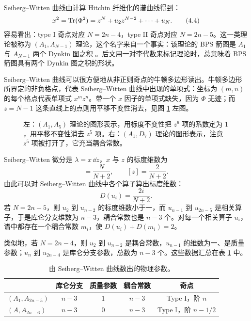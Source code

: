 Seiberg--Witten 曲线由计算 Hitchin 纤维化的谱曲线得到：
\begin{equation}
x^2 = \operatorname{Tr}(\Phi^2) = z^N + u_2 z^{N-2} + \cdots + u_N .
\label{eq:4.4}\tag{4.4}
\end{equation}
容易看出：type I 奇点对应 $N = 2n-4$，type II 奇点对应 $N = 2n-5$。这一类理论被称为 $(A_1,A_{N-1})$ 理论，这个名字来自一个事实：该理论的 BPS 箭图是 $A_1$ 与 $A_{N-1}$ 两个 Dynkin 图之积 \cite{3,17,31}。后文用一对李代数来标记理论时，总意味着 BPS 箭图具有两个 Dynkin 图之积的形状。

Seiberg--Witten 曲线可以很方便地从非正则奇点的牛顿多边形读出。牛顿多边形所界定的非负格点，代表 Seiberg--Witten 曲线中出现的单项式：坐标为 $(m,n)$ 的每个格点代表单项式 $x^mz^n$。带一个 $x$ 因子的单项式缺失，因为 $\Phi$ 无迹；而 $z = N-1$ 这条直线上的点则用平移不变性消去，见图 \ref{fig:3} 左图。

\begin{figure}[tbp]
\centering

\caption{左：$(A_1,A_5)$ 理论的图形表示，用标度不变性把 $z^6$ 项的系数定为 $1$，用平移不变性消去 $z^5$ 项。右：$(A_1,D_7)$ 理论的图形表示，注意 $z^5$ 项被打开了，它充当耦合常数。}
\label{fig:3}
\end{figure}

Seiberg--Witten 微分是 $\lambda = x\,\dd z$，$x$ 与 $z$ 的标度维数为
\begin{equation}
[x] = \frac{N}{N+2},\qquad [z] = \frac{2}{N+2}.
\label{eq:4.5}\tag{4.5}
\end{equation}
由此可以对 Seiberg--Witten 曲线中各个算子算出标度维数：
\begin{equation}
D(u_i) = \frac{2i}{N+2}.
\label{eq:4.6}\tag{4.6}
\end{equation}
若 $N = 2n-5$，则 $u_2$ 到 $u_{n-2}$ 的标度维数小于一，而 $u_{n-1}$ 到 $u_{2n-5}$ 是相关算子，于是库仑分支维数为 $n-3$，耦合常数也是 $n-3$ 个。对每一个相关算子 $u_i$，谱中都存在一个耦合常数 $m_i$，使 $D(u_i)+D(m_i)=2$。

类似地，若 $N = 2n-4$，则 $u_2$ 到 $u_{n-2}$ 是耦合常数，$u_{n-1}$ 的维数为一、是质量参数；$u_n$ 到 $u_{2n-4}$ 是库仑分支参数，总数为 $n-3$ 个。这些数据汇总在表 \ref{tab:2} 中。

\begin{table}[tbp]
\centering
\caption{由 Seiberg--Witten 曲线数出的物理参数。}
\label{tab:2}
\begin{tabular}{lcccc}
\toprule
 & 库仑分支 & 质量参数 & 耦合常数 & 奇点\\
\midrule
$(A_1,A_{2n-5})$ & $n-3$ & 1 & $n-3$ & Type I，阶 $n$\\
$(A,A_{2n-6})$   & $n-3$ & 0 & $n-3$ & Type I，阶 $n-1/2$\\
\bottomrule
\end{tabular}
\end{table}

